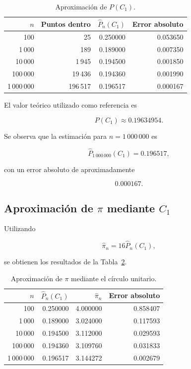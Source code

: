 \documentclass[12pt,a4paper]{article}
\begin{document}
\begin{table}[H]
\centering
\caption{Aproximación de \(P(C_1)\).}
\label{tab:probabilidad}

\begin{tabular}{rrrr}
\toprule
\(n\) & Puntos dentro & \(\widehat{P}_n(C_1)\) &
Error absoluto \\
\midrule
100 & 25 & 0.250000 & 0.053650 \\
1\,000 & 189 & 0.189000 & 0.007350 \\
10\,000 & 1\,945 & 0.194500 & 0.001850 \\
100\,000 & 19\,436 & 0.194360 & 0.001990 \\
1\,000\,000 & 196\,517 & 0.196517 & 0.000167 \\
\bottomrule
\end{tabular}

\end{table}

El valor teórico utilizado como referencia es

\[
P(C_1)\approx0.19634954.
\]

Se observa que la estimación para \(n=1\,000\,000\) es

\[
\widehat{P}_{1\,000\,000}(C_1)=0.196517,
\]

con un error absoluto de aproximadamente

\[
0.000167.
\]

\subsection{Aproximación de \(\pi\) mediante \(C_1\)}

Utilizando

\[
\widehat{\pi}_n
=
16\widehat{P}_n(C_1),
\]

se obtienen los resultados de la Tabla~\ref{tab:pi}.

\begin{table}[H]
\centering
\caption{Aproximación de \(\pi\) mediante el círculo unitario.}
\label{tab:pi}

\begin{tabular}{rrrr}
\toprule
\(n\) & \(\widehat{P}_n(C_1)\) &
\(\widehat{\pi}_n\) & Error absoluto \\
\midrule
100 & 0.250000 & 4.000000 & 0.858407 \\
1\,000 & 0.189000 & 3.024000 & 0.117593 \\
10\,000 & 0.194500 & 3.112000 & 0.029593 \\
100\,000 & 0.194360 & 3.109760 & 0.031833 \\
1\,000\,000 & 0.196517 & 3.144272 & 0.002679 \\
\bottomrule
\end{tabular}

\end{table}
\end{document}
